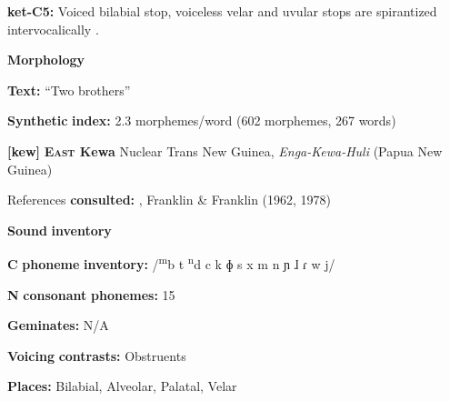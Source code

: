 \documentclass[output=paper]{langsci/langscibook}
\begin{document}
\begin{styleBody}
\textbf{ket-C5:} Voiced bilabial stop, voiceless velar and uvular stops are spirantized intervocalically \citep[75-8]{Georg2007}.
\end{styleBody}

\begin{styleBody}
\textbf{Morphology}
\end{styleBody}

\begin{styleBody}
\textbf{Text:} “Two brothers” \citep[92-97]{Vajda2004}
\end{styleBody}

\begin{styleBody}
\textbf{Synthetic} \textbf{index:} 2.3 morphemes/word (602 morphemes, 267 words)
\end{styleBody}

\begin{styleBody}
\textbf{[kew]}   \textbf{\textsc{East} \textbf{Kewa}}  Nuclear Trans New Guinea, \textit{Enga-Kewa-Huli} (Papua New Guinea)
\end{styleBody}

\begin{styleBody}
References \textbf{consulted:} \citet{Franklin1971}, Franklin \& Franklin (1962, 1978)
\end{styleBody}

\begin{styleBody}
\textbf{Sound} \textbf{inventory}
\end{styleBody}

\begin{styleBody}
\textbf{C} \textbf{phoneme} \textbf{inventory:} /\textsuperscript{m}b t \textsuperscript{n}d c k ɸ s x m n ɲ ɺ ɾ w j/
\end{styleBody}

\begin{styleBody}
\textbf{N} \textbf{consonant} \textbf{phonemes:} 15
\end{styleBody}

\begin{styleBody}
\textbf{Geminates:} N/A
\end{styleBody}

\begin{styleBody}
\textbf{Voicing} \textbf{contrasts:} Obstruents
\end{styleBody}

\begin{styleBody}
\textbf{Places:} Bilabial, Alveolar, Palatal, Velar
\end{styleBody}
\end{document}
